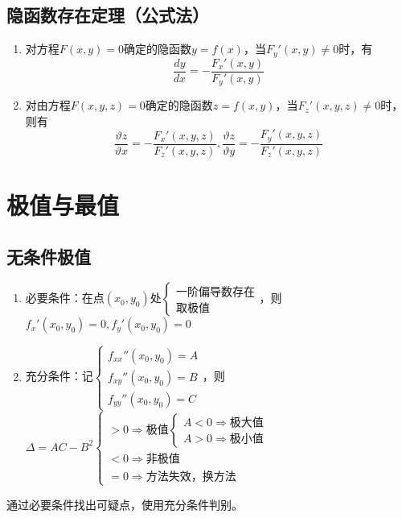 \subsection{隐函数存在定理（公式法）}
\begin{enumerate}
    \item 对方程\(F(x, y) = 0\)确定的隐函数\(y = f(x)\)，当\(F_y'(x, y) \neq 0\)时，有\[\dfrac{dy}{dx} = -\dfrac{F_x'(x, y)}{F_y'(x, y)}\]

    \item 对由方程\(F(x, y, z) = 0\)确定的隐函数\(z = f(x, y)\)，当\(F_z'(x, y, z) \neq 0\)时，则有\[\dfrac{\vartheta z}{\vartheta x} = -\dfrac{F_x'(x, y, z)}{F_z'(x, y, z)}, \dfrac{\vartheta z}{\vartheta y} = -\dfrac{F_y'(x, y, z)}{F_z'(x, y, z)}\]
\end{enumerate}


\section{极值与最值}

\subsection{无条件极值}
\begin{enumerate}
    \item 必要条件：在点\((x_0, y_0)\)处\(\begin{cases}
        \text{一阶偏导数存在} \\ 
        \text{取极值}
    \end{cases}\)，则\(f_x'(x_0, y_0) = 0, f_y'(x_0, y_0) = 0\)
    \item 充分条件：记\(\begin{cases}
        f_{xx}''(x_0, y_0) = A \\ 
        f_{xy}''(x_0, y_0) = B \\ 
        f_{yy}''(x_0, y_0) = C
    \end{cases}\)，则\(\Delta = AC - B^2\begin{cases}
        > 0 \Rightarrow \text{极值}\begin{cases}
            A < 0 \Rightarrow \text{极大值} \\ 
            A > 0 \Rightarrow \text{极小值}
        \end{cases} \\ 
        < 0 \Rightarrow \text{非极值} \\ 
        = 0 \Rightarrow \text{方法失效，换方法}
    \end{cases}\)
\end{enumerate}
通过必要条件找出可疑点，使用充分条件判别。


